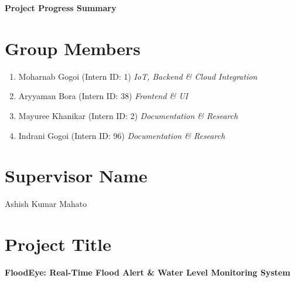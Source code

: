 \documentclass[10pt,a4paper]{article}
\begin{document}
\begin{center}
    {\LARGE\textbf{Project Progress Summary}} \\[6pt]
\end{center}

\vspace{0.5cm}

\section*{Group Members}

\begin{enumerate}[leftmargin=2em, itemsep=2pt]
    \item Moharnab Gogoi (Intern ID: 1) \hfill \textit{IoT, Backend \& Cloud Integration}
    \item Aryyaman Bora (Intern ID: 38) \hfill \textit{Frontend \& UI}
    \item Mayuree Khanikar (Intern ID: 2) \hfill \textit{Documentation \& Research}
    \item Indrani Gogoi (Intern ID: 96) \hfill \textit{Documentation \& Research}
\end{enumerate}

\vspace{0.4cm}

\section*{Supervisor Name}

Ashish Kumar Mahato

\vspace{0.4cm}

\section*{Project Title}

\textbf{FloodEye: Real-Time Flood Alert \& Water Level Monitoring System}
\end{document}
